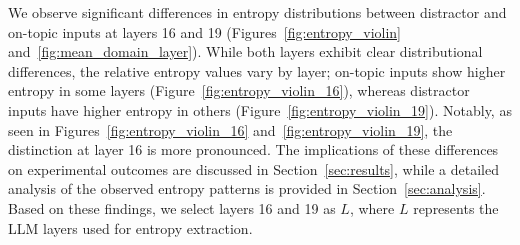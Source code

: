 \documentclass[11pt]{article}
\begin{document}
We observe significant differences in entropy distributions between distractor and on-topic inputs at layers 16 and 19 (Figures~\ref{fig:entropy_violin} and~\ref{fig:mean_domain_layer}). While both layers exhibit clear distributional differences, the relative entropy values vary by layer; on-topic inputs show higher entropy in some layers (Figure~\ref{fig:entropy_violin_16}), whereas distractor inputs have higher entropy in others (Figure~\ref{fig:entropy_violin_19}). Notably, as seen in Figures~\ref{fig:entropy_violin_16} and~\ref{fig:entropy_violin_19}, the distinction at layer 16 is more pronounced. The implications of these differences on experimental outcomes are discussed in Section~\ref{sec:results}, while a detailed analysis of the observed entropy patterns is provided in Section~\ref{sec:analysis}. Based on these findings, we select layers 16 and 19 as \( L \), where \( L \) represents the LLM layers used for entropy extraction.
\end{document}
